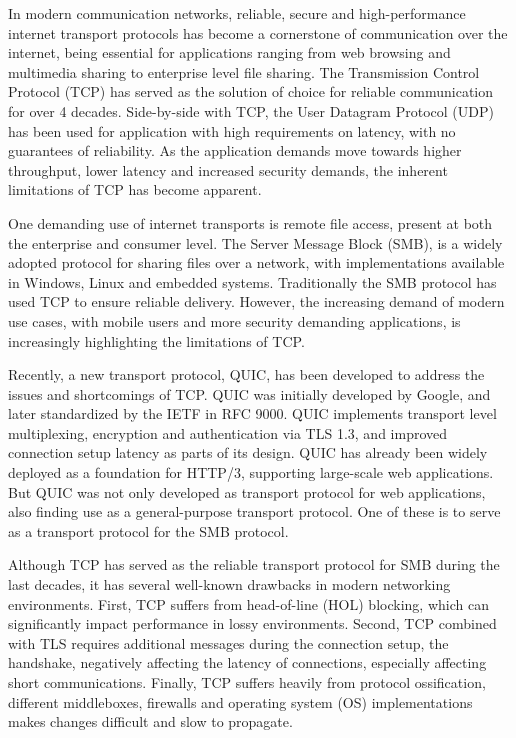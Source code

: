 \documentclass[english, 12pt, a4paper, elec, utf8, a-2b, online]{aaltothesis}
\begin{document}
In modern communication networks, reliable, secure and high-performance internet
transport protocols has become a cornerstone of communication over the internet,
being essential for applications ranging from web browsing and multimedia sharing
to enterprise level file sharing. The Transmission Control Protocol (TCP)\cite{rfc793}
has served as the solution of choice for reliable communication for over 4 decades.
Side-by-side with TCP, the User Datagram Protocol (UDP)\cite{rfc768} has been
used for application with high requirements on latency, with no guarantees of
reliability. As the application demands move towards higher throughput, lower latency
and increased security demands, the inherent limitations of TCP has become apparent.

One demanding use of internet transports is remote file access, present at both
the enterprise and consumer level. The Server Message Block (SMB)\cite{smb2}, is a
widely adopted protocol for sharing files over a network, with implementations available
in Windows, Linux and embedded systems. Traditionally the SMB protocol has used
TCP to ensure reliable delivery\cite{smb2}. However, the increasing demand of modern
use cases, with mobile users and more security demanding applications, is increasingly
highlighting the limitations of TCP.

Recently, a new transport protocol, QUIC, has been developed to address
the issues and shortcomings of TCP. QUIC was initially developed by Google\cite{quic_transport_protocol_design},
and later standardized by the IETF in RFC 9000\cite{rfc9000}. QUIC implements transport
level multiplexing, encryption and authentication via TLS 1.3, and improved connection
setup latency as parts of its design\cite{rfc9000,rfc9001}. QUIC has already been
widely deployed as a foundation for HTTP/3\cite{rfc9114}, supporting large-scale
web applications. But QUIC was not only developed as transport protocol for web applications,
also finding use as a general-purpose transport protocol\cite{rfc9000}. One of these is 
to serve as a transport protocol for the SMB protocol.

Although TCP has served as the reliable transport protocol for SMB during the last
decades, it has several well-known drawbacks in modern networking environments.
First, TCP suffers from head-of-line (HOL) blocking, which can significantly
impact performance in lossy environments. Second, TCP combined with TLS requires
additional messages during the connection setup, the handshake, negatively affecting
the latency of connections, especially affecting short communications. Finally,
TCP suffers heavily from protocol ossification, different middleboxes, firewalls and
operating system (OS) implementations makes changes difficult and slow to propagate\cite{quic_transport_protocol_design}.
\end{document}
